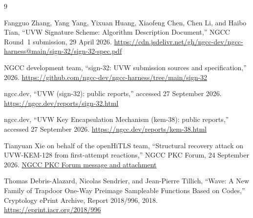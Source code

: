\documentclass[11pt,a4paper]{article}
\begin{document}
\begin{thebibliography}{9}

Fangguo Zhang, Yang Yang, Yixuan Huang, Xiaofeng Chen, Chen Li, and Haibo Tian,
``UVW Signature Scheme: Algorithm Description Document,''
NGCC Round~1 submission, 29 April 2026.
\url{https://cdn.jsdelivr.net/gh/ngcc-dev/ngcc-harness@main/sign-32/sign-32-spec.pdf}

NGCC development team,
``sign-32: UVW submission sources and specification,'' 2026.
\url{https://github.com/ngcc-dev/ngcc-harness/tree/main/sign-32}

ngcc.dev,
``UVW (sign-32): public reports,'' accessed 27 September 2026.
\url{https://ngcc.dev/reports/sign-32.html}

ngcc.dev,
``UVW Key Encapsulation Mechanism (kem-38): public reports,''
accessed 27 September 2026.
\url{https://ngcc.dev/reports/kem-38.html}

Tianyuan Xie on behalf of the openHiTLS team,
``Structural recovery attack on UVW-KEM-128 from first-attempt reactions,''
NGCC PKC Forum, 24 September 2026.
\href{https://list.niccs.org.cn/archives/list/pkcforum@list.niccs.org.cn/message/A6PUI23BHC7YNE5UQ3SMRO33GDBWCF2P/}
{NGCC PKC Forum message and attachment}

Thomas Debris-Alazard, Nicolas Sendrier, and Jean-Pierre Tillich,
``Wave: A New Family of Trapdoor One-Way Preimage Sampleable Functions Based
on Codes,'' Cryptology ePrint Archive, Report 2018/996, 2018.
\url{https://eprint.iacr.org/2018/996}

\end{thebibliography}
\end{document}
